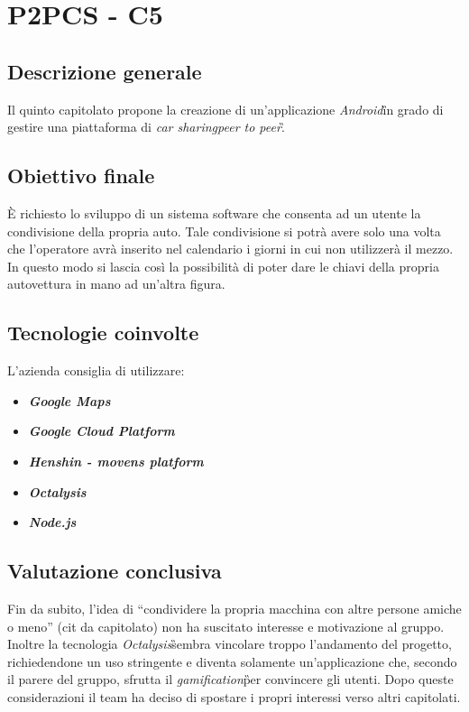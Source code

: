 \section{P2PCS - C5} \label{c5}
    \subsection{Descrizione generale}
    Il quinto capitolato propone la creazione di un'applicazione \textit{Android}\G in grado di gestire una piattaforma di \textit{car sharing}\G \textit{peer to peer}\G.

    \subsection{Obiettivo finale}
    È richiesto lo sviluppo di un sistema software che consenta ad un utente la condivisione della propria auto. Tale condivisione si potrà avere solo una volta che l'operatore avrà inserito nel calendario i giorni in cui non utilizzerà il mezzo.
    In questo modo si lascia così la possibilità di poter dare le chiavi della propria autovettura in mano ad un'altra figura.

    \subsection{Tecnologie coinvolte}
	L'azienda consiglia di utilizzare:
    	\begin{itemize}
    		\item \textit{\textbf{Google Maps}}\GAlt
		\item \textit{\textbf{Google Cloud Platform}}\GAlt
		\item \textit{\textbf{Henshin - movens platform}}\GAlt
		\item \textit{\textbf{Octalysis}}\GAlt
		\item \textit{\textbf{Node.js}}\GAlt
	\end{itemize}
	
    \subsection{Valutazione conclusiva}
    Fin da subito, l'idea di ``condividere la propria macchina con altre persone amiche o meno'' (cit da capitolato) non ha suscitato interesse e motivazione al gruppo. Inoltre la tecnologia \textit{Octalysis}\G sembra vincolare troppo l'andamento del progetto, richiedendone un uso stringente e diventa solamente un'applicazione che, secondo il parere del gruppo, sfrutta il \textit{gamification}\G per convincere gli utenti. Dopo queste considerazioni il team ha deciso di spostare i propri interessi verso altri capitolati.
